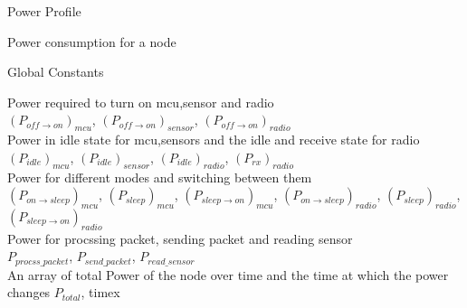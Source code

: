 \documentclass{article}
\begin{document}
\centerline{\sc \huge Power Profile}


\begin{center}
	\large{Power consumption for a node}
\end{center}

\begin{center}
	Global Constants
\end{center}

Power required to turn on mcu,sensor and radio \\
$(P_{off \to on})_{mcu}$,
$(P_{off \to on})_{sensor}$,
$(P_{off \to on})_{radio}$
\\

Power in idle state for mcu,sensors and the idle and receive state for radio \\
$(P_{idle})_{mcu}$,
$(P_{idle})_{sensor}$,
$(P_{idle})_{radio}$,
$(P_{rx})_{radio}$
\\

Power for different modes and switching between them \\
$(P_{on \to sleep})_{mcu}$,
$(P_{sleep})_{mcu}$,
$(P_{sleep \to on})_{mcu}$,
$(P_{on \to sleep})_{radio}$,
$(P_{sleep})_{radio}$,
$(P_{sleep \to on})_{radio}$
\\

Power for procssing packet, sending packet and reading sensor \\
$P_{procss\_packet}$,
$P_{send\_packet}$,
$P_{read\_sensor}$
\\

An array of total Power of the node over time and the time at which the power changes
$P_{total}$, timex
\end{document}
